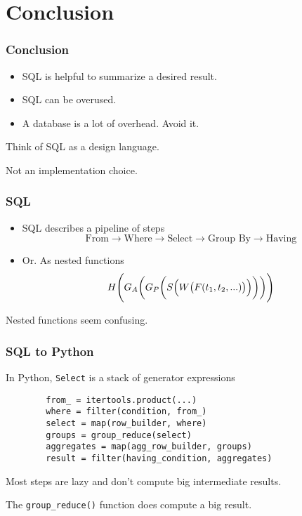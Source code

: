 \documentclass{beamer}
\begin{document}
\section{Conclusion}
\begin{frame}
    \frametitle{Conclusion}

    \begin{itemize}
        \item SQL is helpful to summarize a desired result.
        \item SQL can be overused.
        \item A database is a lot of overhead. Avoid it.
    \end{itemize}
    \vspace{1em}
    Think of SQL as a design language.\pause

    Not an implementation choice.
\end{frame}

\begin{frame}
    \frametitle{SQL}

    \begin{itemize}
        \item SQL describes a pipeline of steps
        \[
            \textrm{From} \rightarrow \textrm{Where} \rightarrow \textrm{Select} \rightarrow \textrm{Group By} \rightarrow \textrm{Having}
        \]

        \item Or. As nested functions
        \[
            H\Biggl(G_A \biggl (G_P \biggl( S \Bigl(W \bigl( F(t_1, t_2, ...) \bigr) \Bigr) \biggr)\biggr)\Biggr)
        \]

        \end{itemize}

        Nested functions seem confusing.

\end{frame}

\begin{frame}[fragile]
    \frametitle{SQL to Python}
    In Python, \texttt{Select} is a stack of generator expressions

    \begin{verbatim}
        from_ = itertools.product(...)
        where = filter(condition, from_)
        select = map(row_builder, where)
        groups = group_reduce(select)
        aggregates = map(agg_row_builder, groups)
        result = filter(having_condition, aggregates)
    \end{verbatim}

    Most steps are lazy and don't compute big intermediate results. \pause

    The \texttt{group\_reduce()} function does compute a big result.

\end{frame}
\end{document}
